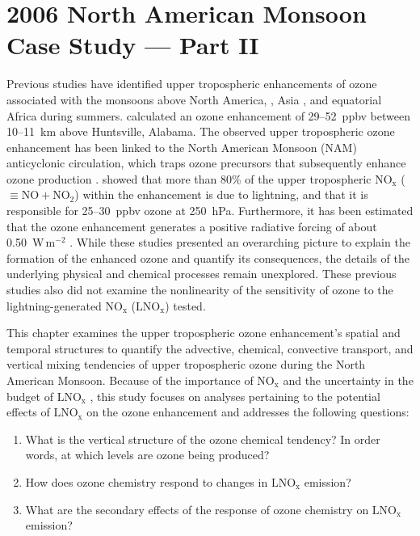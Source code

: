 \chapter{2006 North American Monsoon Case Study --- Part II} \label{ch:2006_5}
\ifpdf
    \graphicspath{{Chapter_2006/figures/PNG/}{Chapter_2006/figures/PDF/}{Chapter_2006/}}
\else
    \graphicspath{{Chapter_2006/figures/EPS/}{Chapter_2006/}}
\fi

Previous studies have identified upper tropospheric enhancements of ozone associated with the monsoons above North America,
\citep[][and references therein]{Li:2005ss,Cooper:2009nx}, Asia \citep{Park:2007bh,Worden:2009ve},
and equatorial Africa \citep{Bouarar:2011ly} during summers.
\citet{Cooper:2007cr} calculated an ozone enhancement of 29--52~ppbv between 10--11~km
above Huntsville, Alabama. The observed upper tropospheric ozone enhancement has
been linked to the North American Monsoon (NAM) anticyclonic circulation, which traps ozone
precursors that subsequently enhance ozone production \citep{Li:2005ss}. \citet{Cooper:2009nx}
showed that more than 80\% of the upper tropospheric NO$_\mathrm{x}$
($\equiv\mathrm{NO}+\mathrm{NO_2}$) within the enhancement
is due to lightning, and that it is responsible for 25--30~ppbv ozone at 250~hPa. Furthermore,
it has been estimated that the ozone enhancement generates a positive radiative forcing of about
0.50~W\,m$^{-2}$ \citep{Cooper:2007cr,Choi:2009bh}. While these studies presented an overarching
picture to explain the formation of the enhanced ozone and quantify its consequences, the details
of the underlying physical and chemical processes remain unexplored. These previous studies also
did not examine the nonlinearity
of the sensitivity of ozone to the lightning-generated $\mathrm{NO_x}$ ($\mathrm{LNO_x}$) tested.

This chapter examines the upper tropospheric ozone enhancement's spatial and
temporal structures to quantify the advective, chemical, convective transport, and vertical
mixing tendencies of upper tropospheric ozone during the North American Monsoon.
Because of the importance of $\mathrm{NO_x}$ \citep{Cooper:2009nx}
and the uncertainty in the budget of $\mathrm{LNO_x}$ \citep{Schumann:2007fk}, this study focuses
on analyses pertaining to the potential effects of $\mathrm{LNO_x}$
on the ozone enhancement and addresses the following questions:
\begin{enumerate}
\item What is the vertical structure of the ozone chemical tendency? In order words,
at which levels are ozone being produced?
\item How does ozone chemistry respond to changes in $\mathrm{LNO_x}$ emission?
\item What are the secondary effects of the response of ozone chemistry on $\mathrm{LNO_x}$ emission?
\end{enumerate}

